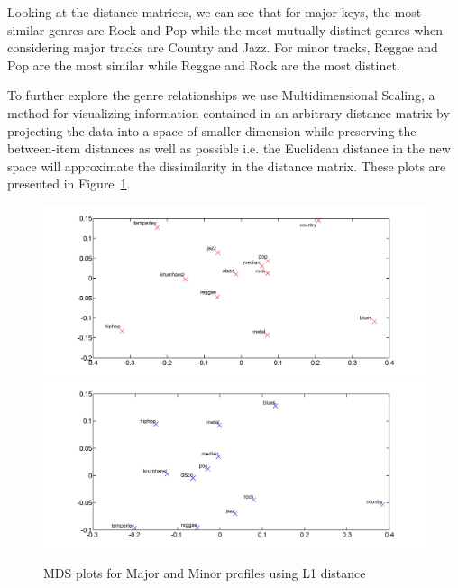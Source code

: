 \documentclass{article}
\begin{document}
Looking at the distance matrices, we can see that for major keys, the most similar genres are Rock and Pop while the most mutually distinct genres when considering major tracks are Country and Jazz. For minor tracks, Reggae and Pop are the most similar while Reggae and Rock are the most distinct.

To further explore the genre relationships we use Multidimensional Scaling, a method for visualizing information contained in an arbitrary distance matrix  by projecting  the data  into a  space of  smaller  dimension while preserving the between-item distances as well as possible i.e. the Euclidean distance in the new space will approximate the dissimilarity in the distance matrix. These plots are presented in Figure~\ref{fig:MDS}. 

\begin{figure}
    \includegraphics[scale=.2]{graph/MDS_maj_colour}
    \includegraphics[scale=.2]{graph/MDS_min_colour}
	\caption{MDS plots for Major and Minor profiles using L1 distance}
	\label{fig:MDS}
\end{figure}
\end{document}
